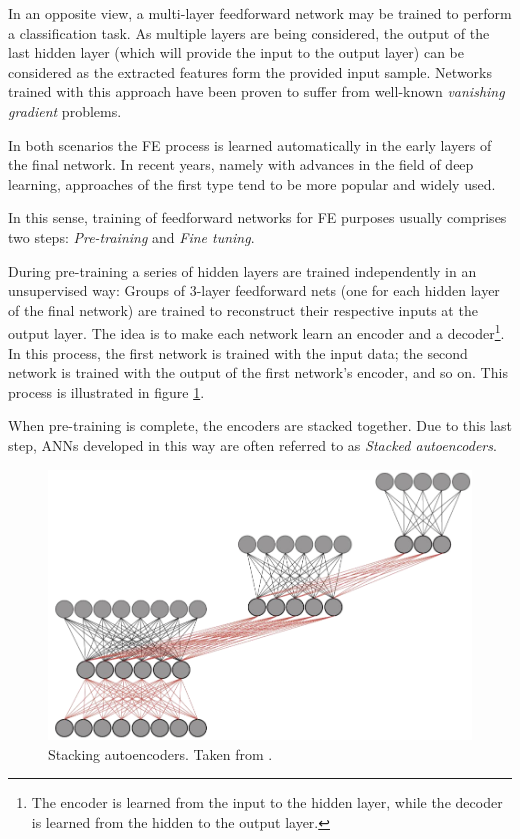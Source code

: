\documentclass[9pt,journal,compsoc]{IEEEtran}
\begin{document}
In an opposite view, a multi-layer feedforward network may be trained to perform a classification task. As multiple layers are being considered, the output of the last hidden layer (which will provide the input to the output layer) can be considered as the extracted features form the provided input sample. Networks trained with this approach have been proven to suffer from well-known \emph{vanishing gradient} problems\cite{nielsen2015neural}.

In both scenarios the FE process is learned automatically in the early layers of the final network. In recent years, namely with advances in the field of deep learning, approaches of the first type tend to be more popular and widely used.

In this sense, training of feedforward networks for FE purposes usually comprises two steps: \emph{Pre-training} and \emph{Fine tuning}.

During pre-training a series of hidden layers are trained independently in an unsupervised way: Groups of 3-layer feedforward nets (one for each hidden layer of the final network) are trained to reconstruct their respective inputs at the output layer. The idea is to make each network learn an encoder and a decoder\footnote{The encoder is learned from the input to the hidden layer, while the decoder is learned from the hidden to the output layer.}. In this process, the first network is trained with the input data; the second network is trained with the output of the first network's encoder, and so on. This process is illustrated in figure \ref{barata_saes}.

When pre-training is complete, the encoders are stacked together. Due to this last step, ANNs developed in this way are often referred to as \emph{Stacked autoencoders}.

\begin{figure}[ht]
	\centering
	\includegraphics[scale=0.25]{stacked_autoencoders.png}
	\caption{Stacking autoencoders. Taken from \cite{barata_saes_presentation}.}
	\label{barata_saes}
\end{figure}
\end{document}
